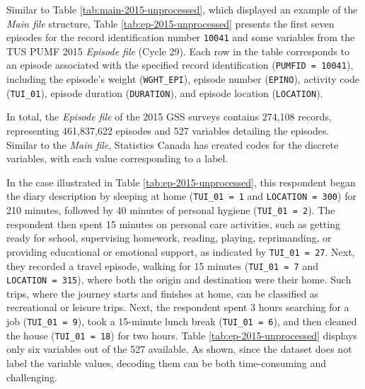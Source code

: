 \documentclass[Royal,times,sageh]{sagej}
\begin{document}
Similar to Table \ref{tab:main-2015-unprocessed}, which displayed an
example of the \emph{Main file} structure, Table
\ref{tab:ep-2015-unprocessed} presents the first seven episodes for the
record identification number \texttt{10041} and some variables from the
TUS PUMF 2015 \emph{Episode file} (Cycle 29). Each row in the table
corresponds to an episode associated with the specified record
identification (\texttt{PUMFID\ =\ 10041}), including the episode's
weight (\texttt{WGHT\_EPI}), episode number (\texttt{EPINO}), activity
code (\texttt{TUI\_01}), episode duration (\texttt{DURATION}), and
episode location (\texttt{LOCATION}).

In total, the \emph{Episode file} of the 2015 GSS surveys contains
274,108 records, representing 461,837,622 episodes and 527 variables
detailing the episodes. Similar to the \emph{Main file}, Statistics
Canada has created codes for the discrete variables, with each value
corresponding to a label.

In the case illustrated in Table \ref{tab:ep-2015-unprocessed}, this
respondent began the diary description by sleeping at home
(\texttt{TUI\_01\ =\ 1} and \texttt{LOCATION\ =\ 300}) for 210 minutes,
followed by 40 minutes of personal hygiene (\texttt{TUI\_01\ =\ 2}). The
respondent then spent 15 minutes on personal care activities, such as
getting ready for school, supervising homework, reading, playing,
reprimanding, or providing educational or emotional support, as
indicated by \texttt{TUI\_01\ =\ 27}. Next, they recorded a travel
episode, walking for 15 minutes (\texttt{TUI\_01\ =\ 7} and
\texttt{LOCATION\ =\ 315}), where both the origin and destination were
their home. Such trips, where the journey starts and finishes at home,
can be classified as recreational or leisure trips. Next, the respondent
spent 3 hours searching for a job (\texttt{TUI\_01\ =\ 9}), took a
15-minute lunch break (\texttt{TUI\_01\ =\ 6}), and then cleaned the
house (\texttt{TUI\_01\ =\ 18}) for two hours. Table
\ref{tab:ep-2015-unprocessed} displays only six variables out of the 527
available. As shown, since the dataset does not label the variable
values, decoding them can be both time-consuming and challenging.

\begingroup\fontsize{8}{10}\selectfont
\end{document}
